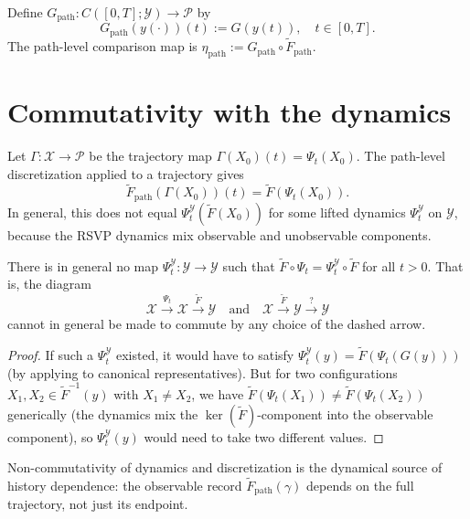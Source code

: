\documentclass[12pt, oneside]{memoir}
\newcommand{\X}{\mathcal{X}}
\newcommand{\PP}{\mathcal{P}}
\newcommand{\Ft}{\widetilde{F}}
\newcommand{\Fpath}{\widetilde{F}_{\mathrm{path}}}
\begin{document}
\begin{definition}
\label{def:Gpath}
Define $G_{\mathrm{path}}: C([0,T];\mathcal{Y}) \to \PP$ by
\[
  G_{\mathrm{path}}(y(\cdot))(t) := G(y(t)), \quad t \in [0,T].
\]
The path-level comparison map is $\eta_{\mathrm{path}} := G_{\mathrm{path}} \circ \Fpath$.
\end{definition}

\section{Commutativity with the dynamics}

Let $\Gamma: \X \to \PP$ be the trajectory map $\Gamma(X_0)(t) = \Psi_t(X_0)$.  The
path-level discretization applied to a trajectory gives
\[
  \Fpath(\Gamma(X_0))(t) = \Ft(\Psi_t(X_0)).
\]
In general, this does not equal $\Psi_t^{\mathcal{Y}}(\Ft(X_0))$ for some lifted
dynamics $\Psi_t^{\mathcal{Y}}$ on $\mathcal{Y}$, because the RSVP dynamics mix
observable and unobservable components.

\begin{proposition}
\label{prop:non-commute}
There is in general no map $\Psi_t^{\mathcal{Y}}: \mathcal{Y} \to \mathcal{Y}$ such that
$\Ft \circ \Psi_t = \Psi_t^{\mathcal{Y}} \circ \Ft$ for all $t > 0$.  That is, the
diagram
\[
  \X \xrightarrow{\Psi_t} \X \xrightarrow{\Ft} \mathcal{Y}
  \quad\text{and}\quad
  \X \xrightarrow{\Ft} \mathcal{Y} \xrightarrow{?} \mathcal{Y}
\]
cannot in general be made to commute by any choice of the dashed arrow.
\end{proposition}

\begin{proof}
If such a $\Psi_t^{\mathcal{Y}}$ existed, it would have to satisfy
$\Psi_t^{\mathcal{Y}}(y) = \Ft(\Psi_t(G(y)))$ (by applying to canonical representatives).
But for two configurations $X_1, X_2 \in \Ft^{-1}(y)$ with $X_1 \ne X_2$, we have
$\Ft(\Psi_t(X_1)) \ne \Ft(\Psi_t(X_2))$ generically (the dynamics mix the
$\ker(\Ft)$-component into the observable component), so $\Psi_t^{\mathcal{Y}}(y)$ would
need to take two different values.
\end{proof}

Non-commutativity of dynamics and discretization is the dynamical source of history
dependence: the observable record $\Fpath(\gamma)$ depends on the full trajectory, not
just its endpoint.
\end{document}
